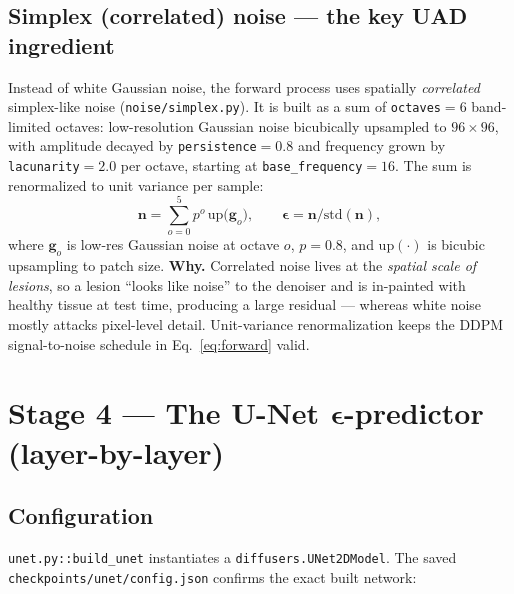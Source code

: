 \documentclass[11pt,a4paper]{article}
\newcommand{\eps}{\bm{\epsilon}}
\newcommand{\code}[1]{\texttt{\small #1}}
\begin{document}
\subsection{Simplex (correlated) noise --- the key UAD ingredient}
Instead of white Gaussian noise, the forward process uses spatially
\emph{correlated} simplex-like noise (\code{noise/simplex.py}). It is built as a
sum of \code{octaves}$=6$ band-limited octaves: low-resolution Gaussian noise
bicubically upsampled to $96\times96$, with amplitude decayed by
\code{persistence}$=0.8$ and frequency grown by \code{lacunarity}$=2.0$ per
octave, starting at \code{base\_frequency}$=16$. The sum is renormalized to unit
variance per sample:
\begin{equation}
\bm n = \sum_{o=0}^{5} p^{o}\,\mathrm{up}\!\big(\bm g_o\big),
\qquad
\eps = \bm n \big/ \mathrm{std}(\bm n),
\end{equation}
where $\bm g_o$ is low-res Gaussian noise at octave $o$, $p=0.8$, and
$\mathrm{up}(\cdot)$ is bicubic upsampling to patch size.
\textbf{Why.} Correlated noise lives at the \emph{spatial scale of lesions}, so a
lesion ``looks like noise'' to the denoiser and is in-painted with healthy
tissue at test time, producing a large residual --- whereas white noise mostly
attacks pixel-level detail. Unit-variance renormalization keeps the DDPM
signal-to-noise schedule in Eq.~\eqref{eq:forward} valid.

\section{Stage 4 — The U-Net $\eps$-predictor (layer-by-layer)}

\subsection{Configuration}
\code{unet.py::build\_unet} instantiates a \code{diffusers.UNet2DModel}. The saved
\code{checkpoints/unet/config.json} confirms the exact built network:
\end{document}
